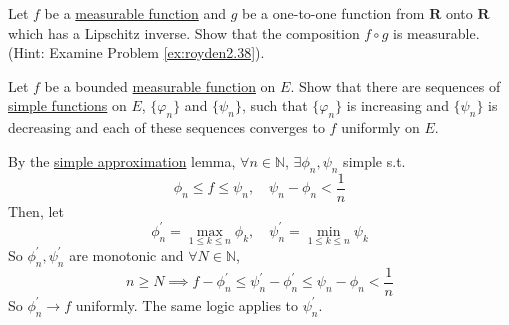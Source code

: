   \begin{exercise}[Royden 3.11]
    Let $f$ be a \hyperref[def:measurable-function]{measurable function} and $g$ be a one-to-one function from $\mathbf{R}$ onto $\mathbf{R}$ which has a Lipschitz inverse. Show that the composition $f \circ g$ is measurable. (Hint: Examine Problem \ref{ex:royden2.38}). 
  \end{exercise}

  \begin{exercise}[Royden 3.12][ex:royden3.12]
    Let $f$ be a bounded \hyperref[def:measurable-function]{measurable function} on $E$. Show that there are sequences of \hyperref[def:simple-functions]{simple functions} on $E$, $\{\varphi_n\}$ and $\{\psi_n\}$, such that $\{\varphi_n\}$ is increasing and $\{\psi_n\}$ is decreasing and each of these sequences converges to $f$ uniformly on $E$.
  \end{exercise}
  \begin{solution}
    By the \hyperref[thm:simple-approximation-theorem]{simple approximation} lemma, $\forall n \in \mathbb{N}$, $\exists \phi_n, \psi_n$ simple s.t. 
    \begin{equation}
      \phi_n \leq f \leq \psi_n, \quad \psi_n - \phi_n < \frac{1}{n}
    \end{equation}
    Then, let 
    \begin{equation}
      \phi_n^\prime = \max_{1 \leq k \leq n} \phi_k, \quad \psi_n^\prime = \min_{1 \leq k \leq n} \psi_k
    \end{equation}
    So $\phi_n^\prime, \psi_n^\prime$ are monotonic and $\forall N \in \mathbb{N}$, 
    \begin{equation}
      n \geq N \implies f - \phi_n^\prime \leq \psi_n^\prime - \phi_n^\prime \leq \psi_n - \phi_n < \frac{1}{n}
    \end{equation}
    So $\phi_n^\prime \to f$ uniformly. The same logic applies to $\psi_n^\prime$. 
  \end{solution}

